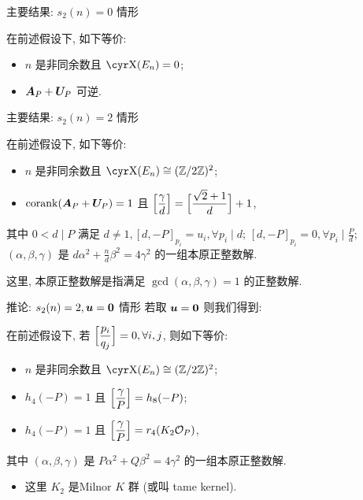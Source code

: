 \documentclass[aspectratio=169]{ctexbeamer}
\renewcommand\aleg[2]{\Bigl[\dfrac{{#1}}{#2}\Bigr]}
\begin{document}
\begin{frame}{主要结果: $s_2(n)=0$ 情形}
	\onslide<+->
	\begin{theorem}
		在前述假设下, 如下等价:
		\begin{itemize}[<*>]
			\item $n$ 是非同余数且 $\Sha(E_n)=0$;
			\item ${\boldsymbol{A}}_P+{\boldsymbol{U}}_P$ 可逆.
		\end{itemize}
	\end{theorem}
\end{frame}


\begin{frame}{主要结果: $s_2(n)=2$ 情形}
	\onslide<+->
	\begin{theorem}
		在前述假设下, 如下等价:
		\begin{itemize}[<*>]
			\item $n$ 是非同余数且 $\Sha(E_n)\cong(\BZ/2\BZ)^2$;
			\item $\operatorname{corank}({\boldsymbol{A}}_P+{\boldsymbol{U}}_P)=1$ 且 $\aleg{\gamma}d=\aleg{\sqrt2+1}{d}+1$,
		\end{itemize}
		其中 $0<d\mid P$ 满足 $d\ne 1, [d,-P]_{p_i}=u_i,\forall p_i\mid d$; $[d,-P]_{p_i}=0,\forall p_i\mid \frac Pd$;  $(\alpha,\beta,\gamma)$ 是 $d\alpha^2+\frac{n}d\beta^2=4\gamma^2$ 的一组本原正整数解.
	\end{theorem}
	\onslide<+->
	这里, 本原正整数解是指满足 $\gcd(\alpha,\beta,\gamma)=1$ 的正整数解.
\end{frame}


\begin{frame}{推论: $s_2(n)=2,{\boldsymbol{u}}={\bf0}$ 情形}
	\onslide<+->
	若取 ${\boldsymbol{u}}={\bf0}$ 则我们得到:
	\onslide<+->
	\begin{corollary}
		在前述假设下, 若 $\aleg{p_i}{q_j}=0, \forall i,j$, 则如下等价:
		\begin{itemize}[<*>]
			\item $n$ 是非同余数且 $\Sha(E_n)\cong(\BZ/2\BZ)^2$;
			\item $h_4(-P)=1$ 且 $\aleg{\gamma}P=h_8(-P)$;
			\item $h_4(-P)=1$ 且 $\aleg{\gamma}P=r_4(K_2\CO_P)$,
		\end{itemize}
		其中 $(\alpha,\beta,\gamma)$ 是 $P\alpha^2+Q\beta^2=4\gamma^2$ 的一组本原正整数解.
	\end{corollary}
	\begin{itemize}
		\item 这里 $K_2$ 是Milnor $K$ 群 (或叫 tame kernel).
	\end{itemize}
\end{frame}
\end{document}
